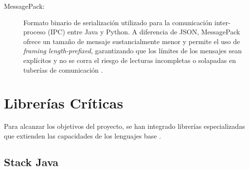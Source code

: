 \begin{description}
    \item[MessagePack:] Formato binario de serialización utilizado para la 
    comunicación inter-proceso (IPC) entre Java y Python. A diferencia de JSON, MessagePack ofrece 
    un tamaño de mensaje sustancialmente menor y permite el uso de 
    \textit{framing length-prefixed}, garantizando que los límites de los mensajes 
    sean explícitos y no se corra el riesgo de lecturas incompletas o solapadas 
    en tuberías de comunicación \parencite{furuhashi_msgpack_2013}.
\end{description}

\section{Librerías Críticas}

Para alcanzar los objetivos del proyecto, se han integrado librerías 
especializadas que extienden las capacidades de los lenguajes base 
\parencite{richards_software_2022}.

\subsection{Stack Java}

